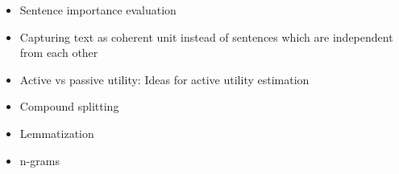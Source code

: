 
\begin{itemize}
    \item Sentence importance evaluation
    \item Capturing text as coherent unit instead of sentences which are independent from each other
    \item Active vs passive utility: Ideas for active utility estimation
    \item Compound splitting
    \item Lemmatization
    \item n-grams
\end{itemize}
